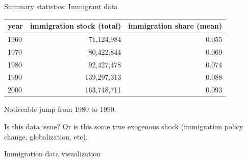 \documentclass[notes,11pt, aspectratio=169]{beamer}
\newenvironment{wideitemize}{\itemize\addtolength{\itemsep}{10pt}}{\enditemize}
\begin{document}
\begin{frame}{Summary statistics: Immigrant data}
\begin{table}
	\centering
	\begin{tabular}{lrr}
		\toprule
		year & immigration stock (total) & immigration share (mean) \\
		\midrule
		1960 & 71,124,984 & 0.055\\
		1970 & 80,422,844 & 0.069\\
		1980 & 92,427,478 & 0.074\\
		\midrule
		1990 & 139,297,313 & 0.088\\
		2000 & 163,748,711 & 0.093\\
		\bottomrule
	\end{tabular}
\end{table}	
\begin{wideitemize}
\item Noticeable jump from 1980 to 1990.
\item Is this data issue? Or is this some true exogenous shock (immigration policy change, globalization, etc).
\end{wideitemize}
\end{frame}

\begin{frame}{Immigration data visualization}
\begin{figure}
	\centering
\end{figure}	
\end{frame}
\end{document}
